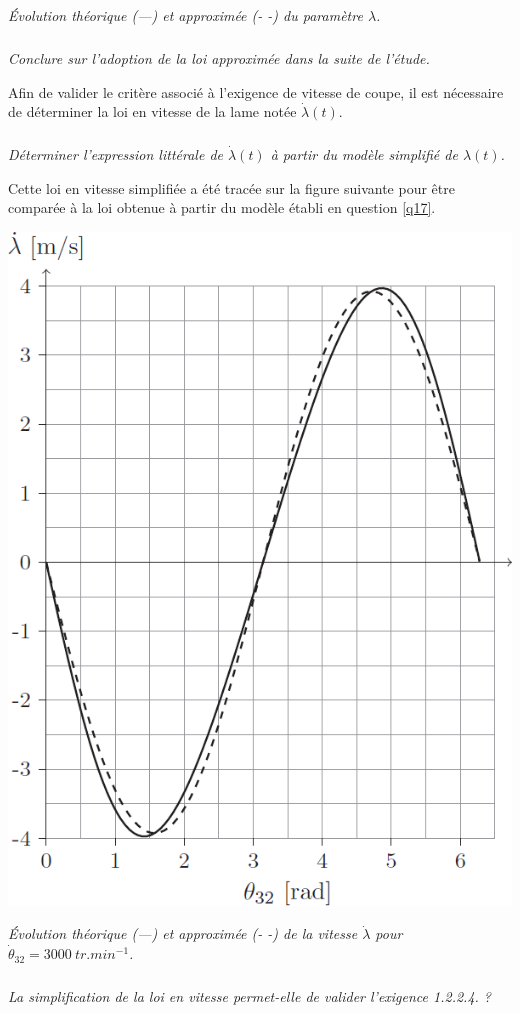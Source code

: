 \begin{multicols}{2}
\begin{center}
\textit{Évolution théorique (---) et approximée (- -) du paramètre $\lambda$.}
\end{center}







\subparagraph{}
\textit{Conclure sur l’adoption de la loi approximée dans la suite de l’étude.}
\ifprof
\begin{corrige}
\end{corrige}
\else
\fi


Afin de valider le critère associé à l’exigence de vitesse de coupe, il est nécessaire de déterminer la
loi en vitesse de la lame notée $\dot{\lambda}(t)$.

\subparagraph{}
\textit{Déterminer l’expression littérale de $\dot{\lambda}(t)$ à partir du modèle simplifié de $\lambda(t)$.}
\ifprof
\begin{corrige}
\end{corrige}
\else
\fi

Cette loi en vitesse simplifiée a été tracée sur la figure suivante pour être comparée à la loi obtenue à
partir du modèle établi en question \ref{q17}.

\begin{center}
\includegraphics[width=.45\linewidth]{images/fig_05}

\textit{Évolution théorique (---) et approximée (- -) de la vitesse  $\dot{\lambda}$ pour $\dot{\theta}_{32}=\SI{3000}{tr.min^{-1}}$.}
\end{center}


\subparagraph{}
\textit{La simplification de la loi en vitesse permet-elle de valider l’exigence 1.2.2.4. ?}
\ifprof
\begin{corrige}
\end{corrige}
\else
\fi

\ifprof
\else
\end{multicols}
\fi

%